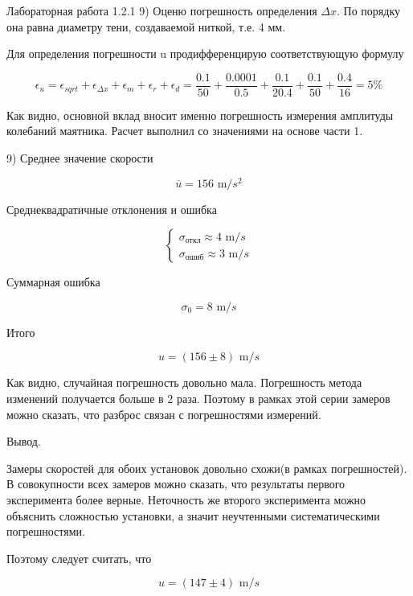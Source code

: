 \documentclass{astroedu-lab}
\begin{document}
\begin{problem}{\large Лабораторная работа 1.2.1}
9) Оценю погрешность определения $\Delta x$. По порядку она равна диаметру тени, создаваемой ниткой, т.е. 4 мм.

Для определения погрешности u продифференцирую соответствующую формулу

\begin{equation}
	\epsilon_u = \epsilon_{sqrt} + \epsilon_{\Delta x} + \epsilon_m + \epsilon_{r} + \epsilon_{d} = \frac{0.1}{50} + \frac{0.0001}{0.5} + \frac{0.1}{20.4} + \frac{0.1}{50} + \frac{0.4}{16} = 5\%
\end{equation}

Как видно, основной вклад вносит именно погрешность измерения амплитуды колебаний маятника. Расчет выполнил со значениями на основе части 1.

9) Среднее значение скорости

\begin{equation}
	\overline{u} = 156 \text{ m}/s^2
\end{equation}

Среднеквадратичные отклонения и ошибка

\begin{equation}
\left\{
\begin{aligned}
\sigma_{\text{откл}} \approx 4 \text{ m}/s \\	
\sigma_{\text{ошиб}} \approx 3 \text{ m}/s
\end{aligned}
\right.
\end{equation}

Суммарная ошибка

\begin{equation}
	\sigma_0 =  8 \text{ m}/s
\end{equation}

Итого

\begin{equation}
	u = (156 \pm 8) \text{ m}/s
\end{equation}

Как видно, случайная погрешность довольно мала. Погрешность метода изменений получается больше в 2 раза. Поэтому в рамках этой серии замеров можно сказать, что разброс связан с погрешностями измерений.

\newpage
\begin{bfseries}
	Вывод.
\end{bfseries}

Замеры скоростей для обоих установок довольно схожи(в рамках погрешностей). В совокупности всех замеров можно сказать, что результаты первого эксперимента более верные. Неточность же второго эксперимента можно объяснить сложностью установки, а значит неучтенными систематическими погрешностями.

Поэтому следует считать, что 

\begin{equation}
	u = (147 \pm 4) \text{ m}/s
\end{equation}

\end{problem}
\end{document}
